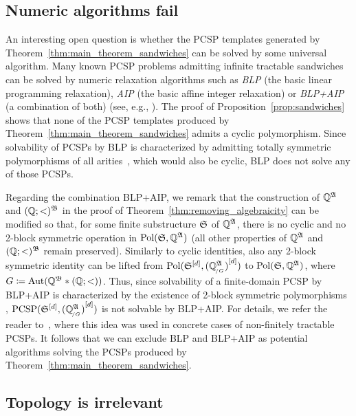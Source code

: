 \subsection{Numeric algorithms fail} An interesting open question is whether the PCSP templates generated by Theorem~\ref{thm:main_theorem_sandwiches} can be solved by some universal algorithm.
%
Many known PCSP problems admitting infinite tractable sandwiches can be solved by numeric relaxation algorithms such as \emph{BLP} (the basic linear programming relaxation), \emph{AIP} (the basic affine integer relaxation) or \emph{BLP+AIP} (a combination of both) (see, e.g., \cite{barto2021algebraic,BLP_AIP}).
%
The proof of Proposition~\ref{prop:sandwiches} shows that none of the PCSP templates produced by Theorem~\ref{thm:main_theorem_sandwiches} admits a cyclic polymorphism.
%
Since solvability of PCSPs by BLP is characterized by admitting totally symmetric polymorphisms of all arities~\cite[Theorem 7.9]{barto2021algebraic}, which would also be cyclic, BLP does not solve any of those PCSPs.

Regarding the combination BLP+AIP, we remark that the construction of $\mathbb{Q}^{\mathfrak{A}}$ and $(\mathbb{Q};<)^{\mathfrak{B}}$ in the proof of Theorem~\ref{thm:removing_algebraicity} can be modified so that, for some finite substructure $\mathfrak{S}$ of $\mathbb{Q}^{\mathfrak{A}}$, there is no cyclic and no 2-block symmetric operation in $\mathrm{Pol}(\mathfrak{S},\mathbb{Q}^{\mathfrak{A}})$ (all other properties of $\mathbb{Q}^{\mathfrak{A}}$ and $(\mathbb{Q};<)^{\mathfrak{B}}$ remain preserved).
%
Similarly to cyclic identities, also any 2-block symmetric identity can be lifted from $\Pol(\fpwr{\struct{S}}{d},\fpwr{(\mathbb{Q}_{\orbeq{G}}^\struct{A})}{d} )$ to $\mathrm{Pol}(\mathfrak{S},\mathbb{Q}^{\mathfrak{A}})$, where $G\mathrel{\mathop:}\mathrel{\mkern-1.2mu}= \smash{\mathrm{Aut}(\mathbb{Q}^{\mathfrak{B}}\ast (\mathbb{Q};<))}$.
%
Thus, since solvability of a finite-domain PCSP by BLP+AIP is characterized by the existence of 2-block symmetric polymorphisms \cite[Theorem 4]{BLP_AIP}, $\PCSP(\fpwr{\struct{S}}{d},\fpwr{(\mathbb{Q}_{\orbeq{G}}^\struct{A})}{d})$ is not solvable by BLP+AIP.
%
For details, we refer the reader to~\cite[Theorem~2]{Mottet_2025}, where this idea was used in concrete cases of non-finitely tractable PCSPs. 
% 
It follows that we can exclude BLP and BLP+AIP as potential algorithms solving the PCSPs produced by Theorem~\ref{thm:main_theorem_sandwiches}. 
%  


\subsection{Topology is irrelevant}
  
